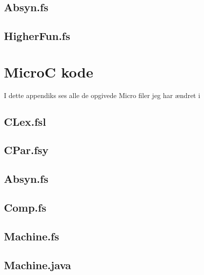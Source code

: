 \documentclass[danish,a4paper]{report}
\begin{document}
\section*{Absyn.fs}

\section*{HigherFun.fs}

\chapter{MicroC kode}

I dette appendiks ses alle de opgivede Micro filer jeg har ændret i

\section*{CLex.fsl}

\section*{CPar.fsy}

\section*{Absyn.fs}

\section*{Comp.fs}

\section*{Machine.fs}

\section*{Machine.java}


\label{LastPage}
\end{document}

